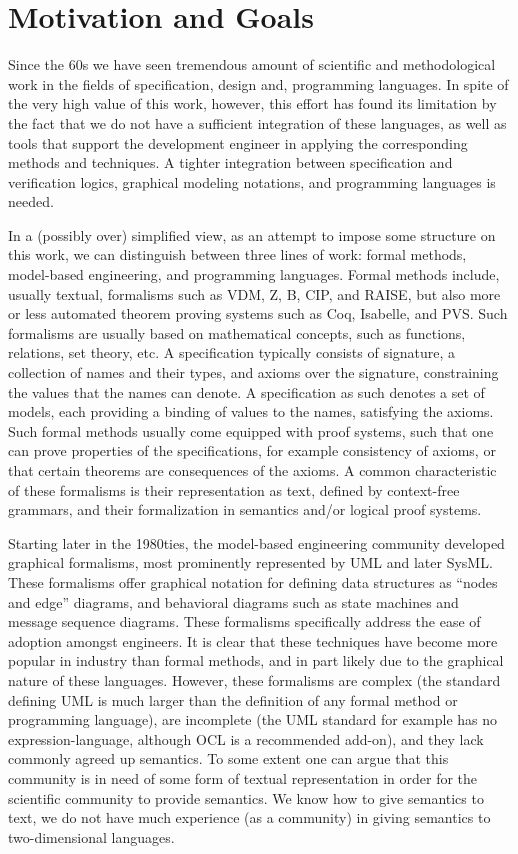 
\section{Motivation and Goals}
\label{sec:introduction}

Since the 60s we have seen tremendous amount of scientific and 
methodological work in the fields of specification, design and, 
programming languages. In spite of the very high value of this work, however, this effort has found its limitation by the fact that we do not have a sufficient integration of these languages, as well as tools that support the development engineer in applying the corresponding methods and techniques. A tighter integration between specification and verification logics, graphical modeling notations, and programming languages is needed.

In a (possibly over) simplified view, as an attempt to impose some 
structure on this work, we can distinguish between three lines of 
work: formal methods, model-based engineering, and 
programming languages. Formal methods include, usually textual, 
formalisms such as VDM, Z, B, CIP, and RAISE, but also more or less 
automated theorem proving systems such as Coq, Isabelle, and 
PVS. Such formalisms are usually based on mathematical 
concepts, such as functions, relations, set theory, etc. A 
specification typically 
consists of signature, a collection of names and their types, and 
axioms over  the signature, constraining the values that 
the names can denote. A specification as such denotes a set of 
models, each providing a binding of values to the names, satisfying 
the axioms. Such formal methods usually come equipped with proof 
systems, such that one can prove properties of the specifications, 
for example consistency of axioms, or that certain theorems are 
consequences of the axioms. A common characteristic of 
these formalisms is their representation as text, defined by context-free grammars, and their formalization in semantics and/or logical proof systems.

Starting later in the 1980ties, the model-based 
engineering community developed graphical formalisms, most 
prominently represented by UML and later SysML. These formalisms 
offer graphical notation for defining data structures as ``nodes 
and edge'' diagrams, and behavioral diagrams such as state machines 
and message sequence diagrams. These formalisms specifically 
address the ease of adoption amongst engineers. It is clear that
these techniques have become more popular in industry than formal 
methods, and in part likely due to the graphical nature of 
these languages. However, these formalisms are complex (the 
standard defining UML is much larger than the definition of any 
formal method or programming language), are incomplete (the UML
standard for example has no expression-language, although OCL is
a recommended add-on), and they lack commonly agreed up semantics. 
To some extent one can argue that this community is in need of some form of 
textual representation in order for the scientific community to 
provide semantics. We know how to give semantics to text, we do not 
have much experience (as a community) in giving semantics to 
two-dimensional languages.

